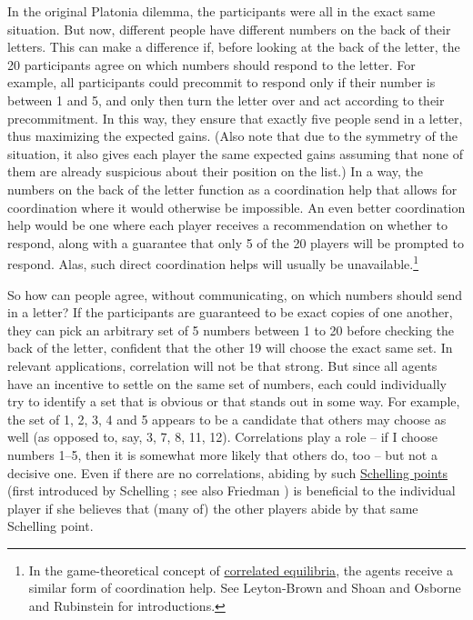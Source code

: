 In the original Platonia dilemma, the participants were all in the exact
same situation. But now, different people have different numbers on the
back of their letters. This can make a difference if, before looking at
the back of the letter, the 20 participants agree on which numbers
should respond to the letter. For example, all participants could
precommit to respond only if their number is between 1 and 5, and only
then turn the letter over and act according to their precommitment. In
this way, they ensure that exactly five people send in a letter, thus
maximizing the expected gains. (Also note that due to the symmetry of
the situation, it also gives each player the same expected gains
assuming that none of them are already suspicious about their position
on the list.) In a way, the numbers on the back of the letter function
as a coordination help that allows for coordination where it would
otherwise be impossible. An even better coordination help would be one
where each player receives a recommendation on whether to respond, along
with a guarantee that only 5 of the 20 players will be prompted to
respond. Alas, such direct coordination helps will usually be
unavailable.\footnote{In the game-theoretical concept of
  \href{https://en.wikipedia.org/wiki/Correlated_equilibrium}{correlated
  equilibria}, the agents receive a similar form of coordination help.
  See Leyton-Brown and Shoan \citeyear{Leyton-Brown2008-un} and
  Osborne and Rubinstein \citeyear{Osborne1994-ln} for introductions.}

So how can people agree, without communicating, on which numbers should
send in a letter? If the participants are guaranteed to be exact copies
of one another, they can pick an arbitrary set of 5 numbers between 1 to
20 before checking the back of the letter, confident that the other 19
will choose the exact same set. In relevant applications, correlation
will not be that strong. But since all agents have an incentive to
settle on the same set of numbers, each could individually try to
identify a set that is obvious or that stands out in some way. For
example, the set of 1, 2, 3, 4 and 5 appears to be a candidate that
others may choose as well (as opposed to, say, 3, 7, 8, 11, 12).
Correlations play a role -- if I choose numbers 1--5, then it is
somewhat more likely that others do, too -- but not a decisive one. Even
if there are no correlations, abiding by such
\href{https://en.wikipedia.org/wiki/Focal_point_(game_theory)}{Schelling
points} (first introduced by Schelling \citeyear{Schelling1960-dn};
see also Friedman \citeyear{Friedman1994-ie}) is beneficial to the
individual player if she believes that (many of) the other players abide
by that same Schelling point.

